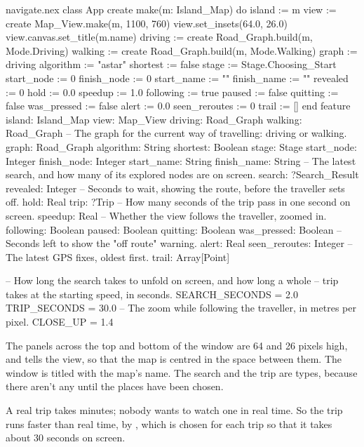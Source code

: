 \begin{append}{navigate.nex}
class App
create
  make(m: Island_Map) do
    island := m
    view := create Map_View.make(m, 1100, 760)
    view.set_insets(64.0, 26.0)
    view.canvas.set_title(m.name)
    driving := create Road_Graph.build(m, Mode.Driving)
    walking := create Road_Graph.build(m, Mode.Walking)
    graph := driving
    algorithm := "astar"
    shortest := false
    stage := Stage.Choosing_Start
    start_node := 0
    finish_node := 0
    start_name := ""
    finish_name := ""
    revealed := 0
    hold := 0.0
    speedup := 1.0
    following := true
    paused := false
    quitting := false
    was_pressed := false
    alert := 0.0
    seen_reroutes := 0
    trail := []
  end
feature
  island: Island_Map
  view: Map_View
  driving: Road_Graph
  walking: Road_Graph
  -- The graph for the current way of travelling: driving or walking.
  graph: Road_Graph
  algorithm: String
  shortest: Boolean
  stage: Stage
  start_node: Integer
  finish_node: Integer
  start_name: String
  finish_name: String
  -- The latest search, and how many of its explored nodes are on screen.
  search: ?Search_Result
  revealed: Integer
  -- Seconds to wait, showing the route, before the traveller sets off.
  hold: Real
  trip: ?Trip
  -- How many seconds of the trip pass in one second on screen.
  speedup: Real
  -- Whether the view follows the traveller, zoomed in.
  following: Boolean
  paused: Boolean
  quitting: Boolean
  was_pressed: Boolean
  -- Seconds left to show the "off route" warning.
  alert: Real
  seen_reroutes: Integer
  -- The latest GPS fixes, oldest first.
  trail: Array[Point]

  -- How long the search takes to unfold on screen, and how long a whole
  -- trip takes at the starting speed, in seconds.
  SEARCH_SECONDS = 2.0
  TRIP_SECONDS = 30.0
  -- The zoom while following the traveller, in metres per pixel.
  CLOSE_UP = 1.4
\end{append}

The panels across the top and bottom of the window are 64 and 26 pixels
high, and  tells the view, so that the map is centred in
the space between them. The window is titled with the map's name. The search and the trip are  types,
because there aren't any until the places have been chosen.

A real trip takes minutes; nobody wants to watch one in real time. So the
trip runs faster than real time, by , which is chosen for
each trip so that it takes about 30 seconds on screen.

